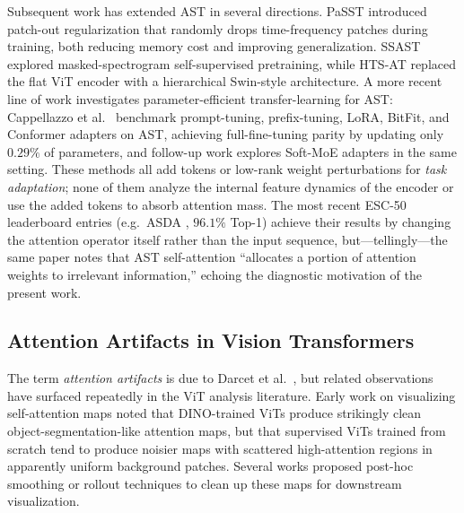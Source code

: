 \documentclass[conference]{IEEEtran}
\begin{document}
Subsequent work has extended AST in several directions. PaSST \cite{koutini2022passt} introduced patch-out regularization that randomly drops time-frequency patches during training, both reducing memory cost and improving generalization. SSAST \cite{gong2022ssast} explored masked-spectrogram self-supervised pretraining, while HTS-AT \cite{chen2022htsat} replaced the flat ViT encoder with a hierarchical Swin-style architecture. A more recent line of work investigates parameter-efficient transfer-learning for AST: Cappellazzo et al.\ \cite{cappellazzo2023petl} benchmark prompt-tuning, prefix-tuning, LoRA, BitFit, and Conformer adapters on AST, achieving full-fine-tuning parity by updating only $0.29\%$ of parameters, and follow-up work \cite{cappellazzo2024softmoe} explores Soft-MoE adapters in the same setting. These methods all add tokens or low-rank weight perturbations for \emph{task adaptation}; none of them analyze the internal feature dynamics of the encoder or use the added tokens to absorb attention mass. The most recent ESC-50 leaderboard entries (e.g.\ ASDA \cite{lin2025asda}, $96.1\%$ Top-1) achieve their results by changing the attention operator itself rather than the input sequence, but---tellingly---the same paper notes that AST self-attention ``allocates a portion of attention weights to irrelevant information,'' echoing the diagnostic motivation of the present work.

\subsection{Attention Artifacts in Vision Transformers}
\label{sec:relwork-artifacts}

The term \emph{attention artifacts} is due to Darcet et al.\ \cite{darcet2024need}, but related observations have surfaced repeatedly in the ViT analysis literature. Early work on visualizing self-attention maps \cite{caron2021dino,naseer2021intriguing} noted that DINO-trained ViTs produce strikingly clean object-segmentation-like attention maps, but that supervised ViTs trained from scratch tend to produce noisier maps with scattered high-attention regions in apparently uniform background patches. Several works \cite{chefer2021transformer,abnar2020quantifying} proposed post-hoc smoothing or rollout techniques to clean up these maps for downstream visualization.
\end{document}
